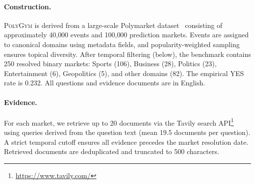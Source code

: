 \begin{table}[!ht]
\centering
\small
{}
\caption{Comparison of forecasting evaluation setups. \textsc{PolyGym} provides fixed evidence and full reproducibility, enabling controlled study of information utilization and multi-agent deliberation.}
\label{tab:benchmark_comparison}
\end{table}

\paragraph{Construction.}
\textsc{PolyGym} is derived from a large-scale Polymarket dataset~\citep{kaggle_polymarket_dataset} consisting of approximately 40{,}000 events and 100{,}000 prediction markets.
Events are assigned to canonical domains using metadata fields, and popularity-weighted sampling ensures topical diversity.
After temporal filtering (below), the benchmark contains 250 resolved binary markets: Sports (106), Business (28), Politics (23), Entertainment (6), Geopolitics (5), and other domains (82).
The empirical YES rate is 0.232.
All questions and evidence documents are in English.

\paragraph{Evidence.}
For each market, we retrieve up to 20 documents via the Tavily search API\footnote{\url{https://www.tavily.com/}} using queries derived from the question text (mean 19.5 documents per question).
A strict temporal cutoff ensures all evidence precedes the market resolution date.
Retrieved documents are deduplicated and truncated to 500 characters.

